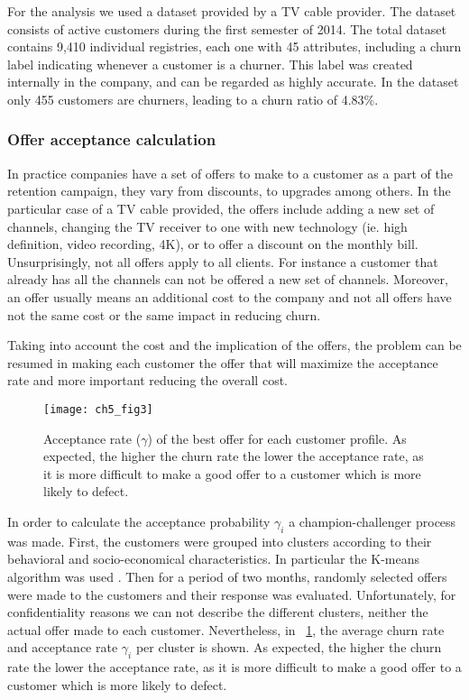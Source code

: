 For the analysis we used a dataset provided by a TV cable provider. 
The dataset consists of active customers during the first semester of 2014. 	
The total dataset contains 9,410 individual registries, each one with 45 attributes, 
including a churn label indicating whenever a customer is a churner.
This label was created internally in the company, and can be regarded as highly accurate. 
In the dataset only 455 customers are churners, leading to a churn ratio of 4.83\%.
	
\subsubsection{Offer acceptance calculation}

In practice companies have a set of offers to make to a customer as a part of the retention 
campaign, they vary from discounts, to upgrades among others. In the particular case of a TV cable 
provided, the offers include adding a new set of channels, changing the TV receiver to one with new 
technology (ie. high definition, video recording, 4K),  or to offer a discount on the monthly bill.
Unsurprisingly, not all offers apply to all clients. For instance a customer that already has all 
the channels can not be offered a new set of channels. Moreover, an offer usually means an 
additional cost to the company and not all offers have not the same cost or the same impact in 
reducing churn.

Taking into account the cost and the implication of the offers, the problem can be 
resumed in making each customer the offer that will maximize the acceptance rate and more 
important reducing the overall cost. 

\begin{figure}[t!]
  \centering
   \texttt{[image: ch5\_fig3]}
  \caption{Acceptance rate ($\gamma$) of the best offer for each customer profile. As expected, 
	the higher the churn rate the lower the acceptance rate, as it is more difficult to make a 
	good offer to a customer which is more likely to defect. }
  \label{fig:ch5:3}
\end{figure}

In order to calculate the acceptance probability $\gamma_i$ a champion-challenger process was made. 
First, the customers were grouped into clusters according to their behavioral and socio-economical 
characteristics. In particular the K-means algorithm was used \citep{Marslan2009}.
Then for a period of two months, randomly selected offers were made to the customers and their 
response was evaluated. Unfortunately, for confidentiality reasons we can not describe the 
different clusters, neither the actual offer made to each customer. Nevertheless, in 
\figurename{~\ref{fig:ch5:3}}, the average churn rate and acceptance rate $\gamma_i$ per cluster is 
shown. As expected, the higher the churn rate the lower the acceptance rate, as it is more difficult 
to make a good offer to a customer which is more likely to defect.


